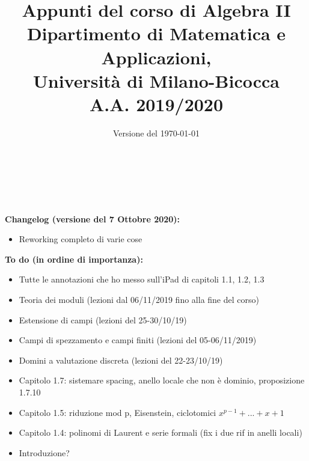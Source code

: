 \documentclass{article}
\begin{document}
\AddToShipoutPicture*{\BackgroundPic}

\title{\Huge{\textbf{Appunti del corso di Algebra II}} \\ \vspace{3mm}
	   \LARGE{\textbf{Dipartimento di Matematica e Applicazioni,}} \\ 
	   \LARGE{\textbf{Università di Milano-Bicocca}} \\ \vspace{3mm}
	   \Large{\textbf{A.A. 2019/2020}} %
		 }

\vspace{-4mm}
\date{Versione del \today}

\maketitle
\thispagestyle{empty}
\clearpage

\tableofcontents

\

\

\noindent \textbf{Changelog (versione del 7 Ottobre 2020):}
\begin{itemize}
\item Reworking completo di varie cose
\end{itemize}

\thispagestyle{empty}

\noindent \textbf{To do (in ordine di importanza):}
\begin{itemize}
	\item Tutte le annotazioni che ho messo sull'iPad di capitoli 1.1, 1.2, 1.3
	\item Teoria dei moduli (lezioni dal 06/11/2019 fino alla fine del corso)
	\item Estensione di campi (lezioni del 25-30/10/19)
	\item Campi di spezzamento e campi finiti (lezioni del 05-06/11/2019)
	\item Domini a valutazione discreta (lezioni del 22-23/10/19)
	\item Capitolo 1.7: sistemare spacing, anello locale che non è dominio, proposizione 1.7.10
	\item Capitolo 1.5: riduzione mod p, Eisenstein, ciclotomici $x^{p-1}+...+x+1$
	\item Capitolo 1.4: polinomi di Laurent e serie formali (fix i due rif in anelli locali)
	\item Introduzione?
\end{itemize}
\clearpage
\end{document}
